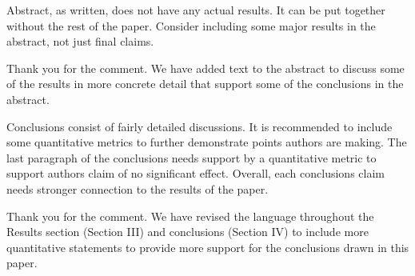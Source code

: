 \documentclass[answers,11pt]{exam}
\begin{document}
\begin{questions} 
	\question Abstract, as written, does not have any actual results. It can be put together without the rest of the paper. Consider including some major results in the abstract, not just final claims. 
	 \begin{solution}
                Thank you for the comment. We have added text to the abstract 
                to discuss some of the results in more concrete detail that 
                support some of the conclusions in the abstract. 
	 \end{solution}


	\question Conclusions consist of fairly detailed discussions. It is recommended
	to include some quantitative metrics to further demonstrate points authors are
	making. The last paragraph of the conclusions needs support by a quantitative
	metric to support authors claim of no significant effect. Overall, each
	conclusions claim needs stronger connection to the results of the paper. 
	 \begin{solution}
                Thank you for the comment. We have revised the language throughout 
                the Results section (Section III) and conclusions (Section IV) 
                to include more quantitative statements to provide more support 
                for the conclusions drawn in this paper. 
	 \end{solution}
 


\end{questions}
\end{document}
